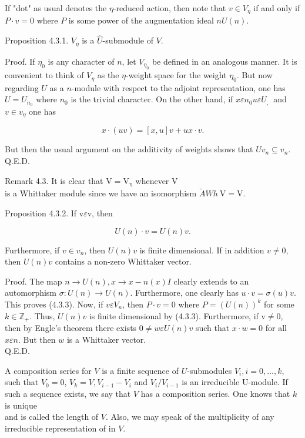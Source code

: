 \documentclass[10pt]{article}
\begin{document}
If "dot" as usual denotes the $\eta$-reduced action, then note that $v \in V_{\eta}$ if and only if $P \cdot v=0$ where $P$ is some power of the augmentation ideal $n U(n)$.

Proposition 4.3.1. $V_{\eta}$ is a $\hat{U}$-submodule of $V$.

Proof. If $\eta_{0}$ is any character of $n$, let $V_{\eta_{0}}$ be defined in an analogous manner. It is convenient to think of $V_{\eta}$ as the $\eta$-weight space for the weight $\eta_{0}$. But now regarding $U$ as a $n$-module with respect to the adjoint representation, one has $U=U_{n_{0}}$ where $n_{0}$ is the trivial character. On the other hand, if $x \varepsilon n_{0} u \varepsilon U_{\text {, }}$ and $v \in v_{\eta}$ one has


\begin{equation*}
x \cdot(u v)=[x, u] v+u x \cdot v . \tag{4.3.2}
\end{equation*}


But then the usual argument on the additivity of weights shows that $U v_{n} \subseteq v_{n}$.\\
Q.E.D.

Remark 4.3. It is clear that $\mathrm{V}=\mathrm{V}_{\mathrm{\eta}}$ whenever V\\
is a Whittaker module since we have an isomorphism $\tilde{A} W h \mathrm{~V}=\mathrm{V}$.

Proposition 4.3.2. If $\mathrm{v} \varepsilon \mathrm{v}$, then


\begin{equation*}
U(n) \cdot v=U(n) v . \tag{4.3.3}
\end{equation*}


Furthermore, if $v \in v_{n}$, then $U(n) v$ is finite dimensional. If in addition $v \neq 0$, then $U(n) v$ contains a non-zero Whittaker vector.

Proof. The map $n \rightarrow U(n), x \rightarrow x-n(x) I$ clearly extends to an automorphism $\sigma: U(n) \rightarrow U(n)$. Furthermore, one clearly has $u \cdot v=\sigma(u) v$. This proves (4.3.3). Now, if $v \varepsilon V_{n}$, then $P \cdot v=0$ where $P=(U(n))^{k}$ for some $k \in \mathbb{Z}_{+}$. Thus, $U(n) v$ is finite dimensional by (4.3.3). Furthermore, if $\mathrm{v} \neq 0$, then by Engle's theorem there exists $0 \neq w \varepsilon U(n) v$ such that $x \cdot w=0$ for all $x \varepsilon n$. But then $w$ is a Whittaker vector.\\
Q.E.D.

A composition series for $V$ is a finite sequence of $U$-submodules $V_{i}, i=0, \ldots, k$, such that $V_{0}=0$, $V_{k}=V, V_{i-1}-V_{i}$ and $V_{i} / V_{i-1}$ is an irreducible U-module. If such a sequence exists, we say that $V$ has a composition series. One knows that $k$ is unique\\
and is called the length of $V$. Also, we may speak of the multiplicity of any irreducible representation of in $V$.
\end{document}
